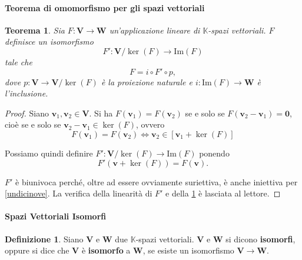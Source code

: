 \documentclass{article}
\theoremstyle{plain}
\newtheorem{thm}{Teorema}[section]
\theoremstyle{definition}
\newtheorem{defn}{Definizione}[section]
\theoremstyle{remark}
\begin{document}
\paragraph{Teorema di omomorfismo per gli spazi vettoriali}
\begin{bxthm}
\begin{thm}
Sia $F: \mathbf{V} \rightarrow \mathbf{W}$ un'applicazione lineare di $\mathbb{K}$-spazi vettoriali. 
$F$ definisce un isomorfismo
\[
F' : \mathbf{V}/\ker(F) \rightarrow \mathrm{Im}(F)
\]
tale che
\begin{equation}
F = i \circ F' \circ p,    
\end{equation}\label{undiciotto}
dove $p: \mathbf{V} \rightarrow \mathbf{V}/\ker(F)$ è la proiezione naturale e $i: \mathrm{Im}(F) \rightarrow \mathbf{W}$ è l'inclusione.    
\end{thm}
\end{bxthm}
\begin{proof}
Siano $\mathbf{v}_1, \mathbf{v}_2 \in \mathbf{V}$. Si ha $F(\mathbf{v}_1) = F(\mathbf{v}_2)$ se e solo se $F(\mathbf{v}_2 - \mathbf{v}_1) = \mathbf{0}$, cioè se e solo se $\mathbf{v}_2 - \mathbf{v}_1 \in \ker(F)$, ovvero
\begin{equation}\label{undicinove}
F(\mathbf{v}_1) = F(\mathbf{v}_2) \iff \mathbf{v}_2 \in [\mathbf{v}_1 + \ker(F)]    
\end{equation}

Possiamo quindi definire $F': \mathbf{V}/\ker(F) \rightarrow \mathrm{Im}(F)$ ponendo
\[
F'(\mathbf{v} + \ker(F)) = F(\mathbf{v}).
\]

$F'$ è biunivoca perché, oltre ad essere ovviamente suriettiva, è anche iniettiva per \ref{undicinove}. 
La verifica della linearità di $F'$ e della \ref{undiciotto} è lasciata al lettore.    
\end{proof}

\vspace{10pt}

\paragraph{Spazi Vettoriali Isomorfi}
\begin{bxthm}
\begin{defn}
Siano $\mathbf{V}$ e $\mathbf{W}$ due $\mathbb{K}$-spazi vettoriali. 
$\mathbf{V}$ e $\mathbf{W}$ si dicono \textbf{isomorfi}, oppure si dice che $\mathbf{V}$ è \textbf{isomorfo} a $\mathbf{W}$, se esiste un isomorfismo $\mathbf{V} \rightarrow \mathbf{W}$.
\end{defn}
\end{bxthm}
\end{document}
